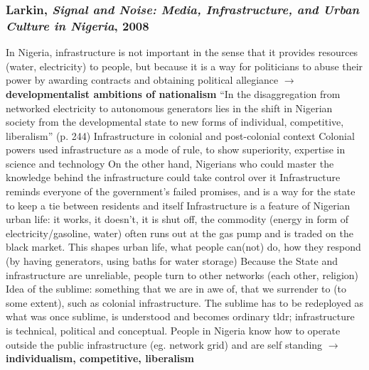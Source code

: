 \documentclass{article}
\begin{document}
\begin{outline}
	\1 
\end{outline}

\subsubsection{Larkin, \textit{Signal and Noise: Media, Infrastructure, and Urban Culture in Nigeria}, 2008}

\begin{outline}
	\1 In Nigeria, infrastructure is not important in the sense that it provides resources (water, electricity) to people, but because it is a way for politicians to abuse their power by awarding contracts and obtaining political allegiance $\rightarrow$ \textbf{developmentalist ambitions of nationalism}
	\1 ``In the disaggregation from networked electricity to autonomous generators lies in the shift in Nigerian society from the developmental state to new forms of individual, competitive, liberalism'' (p. 244)
	\1 Infrastructure in colonial and post-colonial context
		\2 Colonial powers used infrastructure as a mode of rule, to show superiority, expertise in science and technology
		\2 On the other hand, Nigerians who could master the knowledge behind the infrastructure could take control over it 
		\2 Infrastructure reminds everyone of the government's failed promises, and is a way for the state to keep a tie between residents and itself
	\1 Infrastructure is a feature of Nigerian urban life: it works, it doesn't, it is shut off, the commodity (energy in form of electricity/gasoline, water) often runs out at the gas pump and is traded on the black market. This shapes urban life, what people can(not) do, how they respond (by having generators, using baths for water storage)
	\1 Because the State and infrastructure are unreliable, people turn to other networks (each other, religion)
	\1 Idea of the sublime: something that we are in awe of, that we surrender to (to some extent), such as colonial infrastructure. The sublime has to be redeployed as what was once sublime, is understood and becomes ordinary
	\1 tldr; infrastructure is technical, political and conceptual. People in Nigeria know how to operate outside the public infrastructure (eg. network grid) and are self standing $\rightarrow$ \textbf{individualism, competitive, liberalism}
\end{outline}

\end{document}
